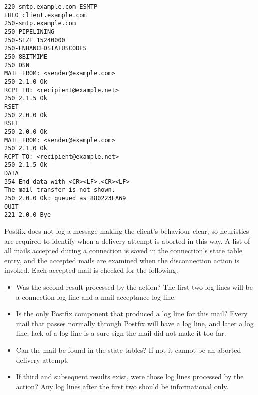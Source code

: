 \begin{verbatim}
220 smtp.example.com ESMTP
EHLO client.example.com
250-smtp.example.com
250-PIPELINING
250-SIZE 15240000
250-ENHANCEDSTATUSCODES
250-8BITMIME
250 DSN
MAIL FROM: <sender@example.com>
250 2.1.0 Ok
RCPT TO: <recipient@example.net>
250 2.1.5 Ok
RSET
250 2.0.0 Ok
RSET
250 2.0.0 Ok
MAIL FROM: <sender@example.com>
250 2.1.0 Ok
RCPT TO: <recipient@example.net>
250 2.1.5 Ok
DATA
354 End data with <CR><LF>.<CR><LF>
The mail transfer is not shown.
250 2.0.0 Ok: queued as 880223FA69
QUIT
221 2.0.0 Bye
\end{verbatim}

Postfix does not log a message making the client's behaviour clear, so
heuristics are required to identify when a delivery attempt is aborted in
this way.  A list of all mails accepted during a connection is saved in the
connection's state table entry, and the accepted mails are examined when
the disconnection action is invoked.  Each accepted mail is checked for the
following:

\begin{itemize}

    \item Was the second result processed by the  action?
        The first two  log lines will be a connection log
        line and a mail acceptance log line.

    \item Is  the only Postfix component that produced a log
        line for this mail?  Every mail that passes normally through
        Postfix will have a  log line, and later a
         log line; lack of a  log line is a
        sure sign the mail did not make it too far.

    \item Can the mail be found in the state tables?  If not it cannot be
        an aborted delivery attempt.

    \item If third and subsequent results exist, were those log lines
        processed by the  action?  Any log lines after
        the first two should be informational only.

\end{itemize}

